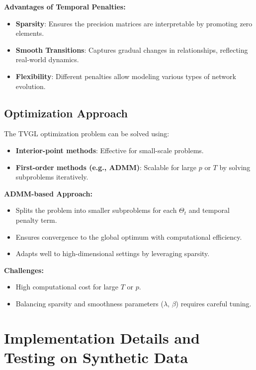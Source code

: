 \documentclass{article}
\begin{document}
\vspace{0.5em}
\noindent\textbf{Advantages of Temporal Penalties:}
\begin{itemize}
    \item \textbf{Sparsity}: Ensures the precision matrices are interpretable by promoting zero elements.
    \item \textbf{Smooth Transitions}: Captures gradual changes in relationships, reflecting real-world dynamics.
    \item \textbf{Flexibility}: Different penalties allow modeling various types of network evolution.
\end{itemize}

\subsection{Optimization Approach}
\label{subsec:optimization}

The TVGL optimization problem can be solved using:
\begin{itemize}
    \item \textbf{Interior-point methods}: Effective for small-scale problems.
    \item \textbf{First-order methods (e.g., ADMM)}: Scalable for large $p$ or $T$ by solving subproblems iteratively.
\end{itemize}

\vspace{0.5em}
\noindent\textbf{ADMM-based Approach:}
\begin{itemize}
    \item Splits the problem into smaller subproblems for each $\Theta_t$ and temporal penalty term.
    \item Ensures convergence to the global optimum with computational efficiency.
    \item Adapts well to high-dimensional settings by leveraging sparsity.
\end{itemize}

\vspace{0.5em}
\noindent\textbf{Challenges:}
\begin{itemize}
    \item High computational cost for large $T$ or $p$.
    \item Balancing sparsity and smoothness parameters ($\lambda$, $\beta$) requires careful tuning.
\end{itemize}



\section{Implementation Details and Testing on Synthetic Data}
\label{sec:implementation_synthetic}
\end{document}
